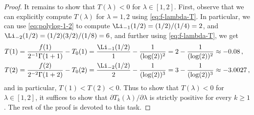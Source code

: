 \begin{proof}
    It remains to show that $T(\lambda) < 0$ for $\lambda \in [1,2]$. 
    First, observe that we can explicitly compute $T(\lambda)$ for $\lambda = 1,2$ using \eqref{eq:f-lambda-T}. 
    In particular, we can use \eqref{eq:polylog-1-2} to compute 
    $\Li_{-1}(1/2) = (1/2) / (1/4) = 2$, and
    $\Li_{-2}(1/2) = (1/2)(3/2)/(1/8) = 6$, and further 
    using \eqref{eq:f-lambda-T}, we get
    \begin{align*}
    T(1) 
    &= \frac{f(1)}{2^{-1}\Gamma(1+1)} - T_0(1) 
    = \frac{\Li_{-1}(1/2)}{1} - \frac{1}{(\log(2))^2} 
    = 2 - \frac{1}{(\log(2))^2} \approx -0.08
    \, , \\
    T(2) 
    &= \frac{f(2)}{2^{-2}\Gamma(1+2)} - T_0(2) 
    = \frac{\Li_{-2}(1/2)}{2} - \frac{1}{(\log(2))^3} 
    = 3 - \frac{1}{(\log(2))^3}
    \approx -3.0027
    \, ,
    \end{align*}
    and in particular, $T(1) < T(2) < 0$. 
    Thus to show that $T(\lambda) < 0$ for $\lambda \in [1,2]$, it suffices to show that 
    $\partial T_k(\lambda)/\partial \lambda$ is strictly positive for every $k \geq 1$. 
    The rest of the proof is devoted to this task.



\end{proof}
